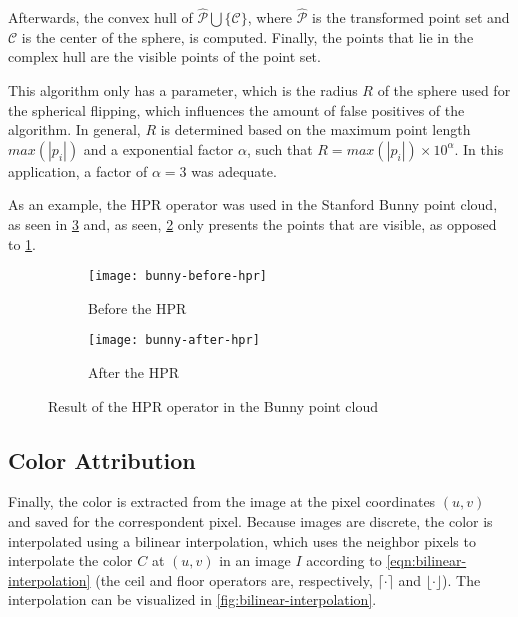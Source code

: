 Afterwards, the convex hull of $\hat{\mathcal{P}} \bigcup \{\mathcal{C}\}$, where $\hat{\mathcal{P}}$ is the transformed point set and $\mathcal{C}$ is the center of the sphere, is computed. Finally, the points that lie in the complex hull are the visible points of the point set.

This algorithm only has a parameter, which is the radius $R$ of the sphere used for the spherical flipping, which influences the amount of false positives of the algorithm. In general, $R$ is determined based on the maximum point length $max(|p_i|)$ and a exponential factor $\alpha$, such that $R = max(|p_i|) \times 10^{\alpha}$. In this application, a factor of $\alpha = 3$ was adequate.

As an example, the HPR operator was used in the Stanford Bunny point cloud, as seen in \cref{fig:hpr-operator-bunny} and, as seen, \cref{fig:after-hpr} only presents the points that are visible, as opposed to \cref{fig:before-hpr}.

\begin{figure}[h]
    
    \centering
    \begin{subfigure}{0.5\textwidth}
        \centering
        \texttt{[image: bunny-before-hpr]}
        \caption{Before the HPR}
        \label{fig:before-hpr}
    \end{subfigure}%
    \begin{subfigure}{0.5\textwidth}
        \centering
        \texttt{[image: bunny-after-hpr]}
        \caption{After the HPR}
        \label{fig:after-hpr}
    \end{subfigure}

    \caption{Result of the HPR operator in the Bunny point cloud}
    \label{fig:hpr-operator-bunny}

\end{figure}

\subsection{Color Attribution}

\newcommand\ceil[1]{\lceil #1 \rceil}
\newcommand\floor[1]{\lfloor #1 \rfloor}

Finally, the color is extracted from the image at the pixel coordinates $(u, v)$ and saved for the correspondent pixel. Because images are discrete, the color is interpolated using a bilinear interpolation, which uses the neighbor pixels to interpolate the color $C$ at $(u, v)$ in an image $I$ according to \cref{eqn:bilinear-interpolation} (the ceil and floor operators are, respectively, $\ceil{\cdot}$ and $\floor{\cdot}$). The interpolation can be visualized in \cref{fig:bilinear-interpolation}.

